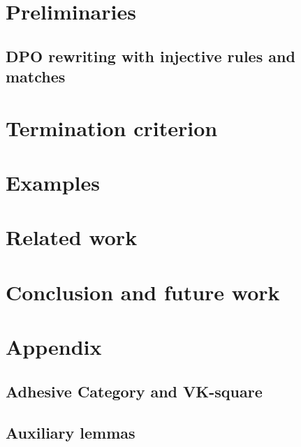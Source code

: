 \documentclass{report}
\begin{document}
\section{Preliminaries} 
\label{subgraph_counting:sec:pre} 
\subsection{DPO rewriting with injective rules and matches} 


 
  
\section{Termination criterion}
\label{subgraph_counting:sec:termination} 

 

\section{Examples} 
\label{subgraph_counting:sec:examples}


  
\section{Related work}
\label{subgraph_counting:sec:related_work} 


\section{Conclusion and future work}
\label{subgraph_counting:sec:conclusion} 


\section{Appendix}
\label{subgraph_counting:sec:appendix}
\subsection*{Adhesive Category and VK-square}

\subsection*{Auxiliary lemmas}

\end{document}
